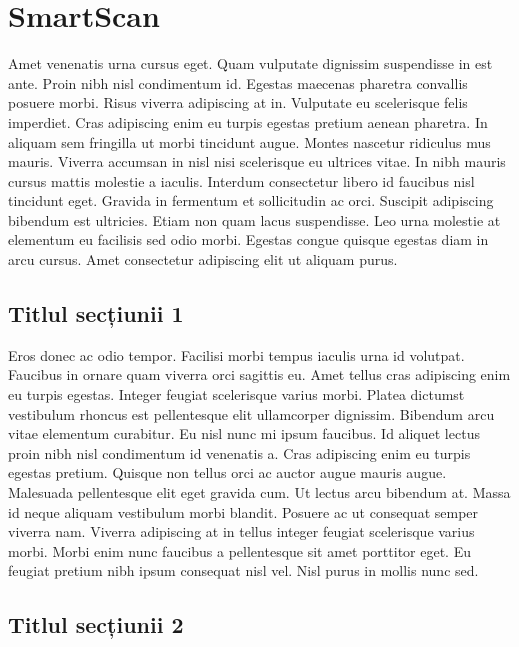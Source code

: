 \chapter{SmartScan}

Amet venenatis urna cursus eget. Quam vulputate dignissim suspendisse in est ante. Proin nibh nisl condimentum id. Egestas maecenas pharetra convallis posuere morbi. Risus viverra adipiscing at in. Vulputate eu scelerisque felis imperdiet. Cras adipiscing enim eu turpis egestas pretium aenean pharetra. In aliquam sem fringilla ut morbi tincidunt augue. Montes nascetur ridiculus mus mauris. Viverra accumsan in nisl nisi scelerisque eu ultrices vitae. In nibh mauris cursus mattis molestie a iaculis. Interdum consectetur libero id faucibus nisl tincidunt eget. Gravida in fermentum et sollicitudin ac orci. Suscipit adipiscing bibendum est ultricies. Etiam non quam lacus suspendisse. Leo urna molestie at elementum eu facilisis sed odio morbi. Egestas congue quisque egestas diam in arcu cursus. Amet consectetur adipiscing elit ut aliquam purus.

\section{Titlul secțiunii 1}

Eros donec ac odio tempor. Facilisi morbi tempus iaculis urna id volutpat. Faucibus in ornare quam viverra orci sagittis eu. Amet tellus cras adipiscing enim eu turpis egestas. Integer feugiat scelerisque varius morbi. Platea dictumst vestibulum rhoncus est pellentesque elit ullamcorper dignissim. Bibendum arcu vitae elementum curabitur. Eu nisl nunc mi ipsum faucibus. Id aliquet lectus proin nibh nisl condimentum id venenatis a. Cras adipiscing enim eu turpis egestas pretium. Quisque non tellus orci ac auctor augue mauris augue. Malesuada pellentesque elit eget gravida cum. Ut lectus arcu bibendum at. Massa id neque aliquam vestibulum morbi blandit. Posuere ac ut consequat semper viverra nam. Viverra adipiscing at in tellus integer feugiat scelerisque varius morbi. Morbi enim nunc faucibus a pellentesque sit amet porttitor eget. Eu feugiat pretium nibh ipsum consequat nisl vel. Nisl purus in mollis nunc sed.

\section{Titlul secțiunii 2}

